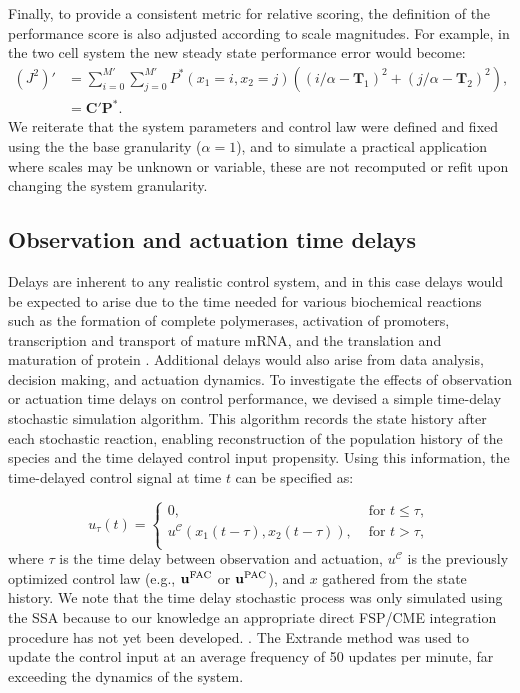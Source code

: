 \documentclass[12pt]{iopart}
\begin{document}
Finally, to provide a consistent metric for relative scoring, the definition of the performance score is also adjusted according to scale magnitudes. For example, in the two cell system the new steady state performance error would become:
\begin{eqnarray}
(J^2)' &= \sum_{i=0}^{M'}  \sum_{j=0}^{M'}P^*(x_1=i,x_2=j) ((i/\alpha - \mathbf T_1)^2 + (j/\alpha -\mathbf T_2)^2),\nonumber \\
& =\mathbf{C}'\mathbf{P}^*.
\label{EuclidV}
\end{eqnarray}
We reiterate that the system parameters and control law were defined and fixed using the the base granularity ($\alpha=1$), and to simulate a practical application where scales may be unknown or variable, these are not recomputed or refit upon changing the system granularity.

\subsection{Observation and actuation time delays}\label{sec:Delay}

Delays are inherent to any realistic control system, and in this case delays would be expected to arise due to the time needed for various biochemical reactions such as the formation of complete polymerases, activation of promoters, transcription and transport of mature mRNA, and the translation and maturation of protein \cite{Cai2007}. 
Additional delays would also arise from data analysis, decision making, and actuation dynamics. 
To investigate the effects of observation or actuation time delays on control performance, we devised a simple time-delay stochastic simulation algorithm. 
This algorithm records the state history after each stochastic reaction, enabling reconstruction of the population history of the species and the time delayed control input propensity.  
Using this information, the time-delayed control signal at time $t$ can be specified as: 

\begin{equation}
u_{\tau}(t)=\left\{
\begin{array}{rl}
      0 ,&\textrm{ for }  t \leq \tau, \\
      {u}^{\mathcal{C}}(x_1(t-\tau), x_2(t-\tau)) , &\textrm{ for }   t > \tau,\\
\end{array}\right. 
\label{timeDelaySSA}
\end{equation}
where $\tau$ is the time delay between observation and actuation, ${u}^{\mathcal{C}}$ is the previously optimized control law (e.g., $\mathbf{u}^{\rm FAC}$ or $\mathbf{u}^{\rm PAC}$), and $x$ gathered from the state history. 
We note that the time delay stochastic process was only simulated using the SSA because to our knowledge an appropriate direct FSP/CME integration procedure has not yet been developed.
\brian[Still missing reference to the extrande method at this website
\url{https://journals.plos.org/ploscompbiol/article?id=10.1371/journal.pcbi.1004923}].
The Extrande method \cite{Voliotis2016} was used to update the control input at an average frequency of 50 updates per minute, far exceeding the dynamics of the system.
\end{document}
